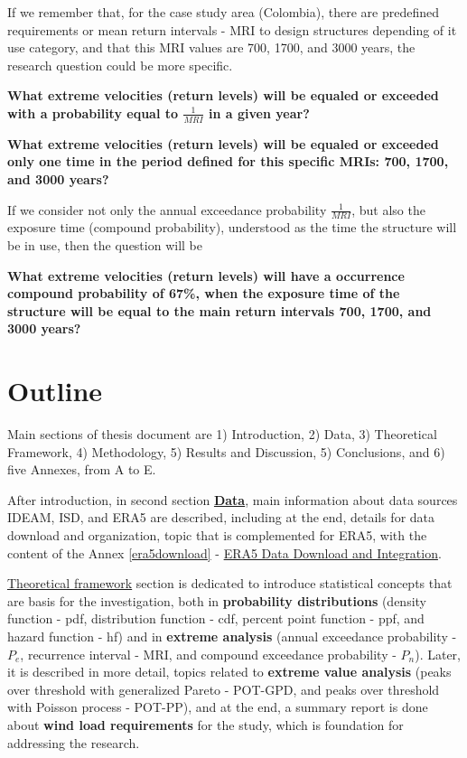 \documentclass[12pt,oneside]{reedthesis}
\begin{document}
If we remember that, for the case study area (Colombia), there are predefined requirements or mean return intervals - MRI to design structures depending of it use category, and that this MRI values are 700, 1700, and 3000 years, the research question could be more specific.

\textbf{What extreme velocities (return levels) will be equaled or exceeded with a probability equal to \(\frac{1}{MRI}\) in a given year?}

\textbf{What extreme velocities (return levels) will be equaled or exceeded only one time in the period defined for this specific MRIs: 700, 1700, and 3000 years?}

If we consider not only the annual exceedance probability \(\frac{1}{MRI}\), but also the exposure time (compound probability), understood as the time the structure will be in use, then the question will be

\textbf{What extreme velocities (return levels) will have a occurrence compound probability of 67\%, when the exposure time of the structure will be equal to the main return intervals 700, 1700, and 3000 years?}

\hypertarget{outline}{%
\section{Outline}\label{outline}}

Main sections of thesis document are 1) Introduction, 2) Data, 3) Theoretical Framework, 4) Methodology, 5) Results and Discussion, 5) Conclusions, and 6) five Annexes, from A to E.

After introduction, in second section \textbf{\protect\hyperlink{rmd-data}{Data}}, main information about data sources IDEAM, ISD, and ERA5 are described, including at the end, details for data download and organization, topic that is complemented for ERA5, with the content of the Annex \ref{era5download} - \protect\hyperlink{era5download}{ERA5 Data Download and Integration}.

\protect\hyperlink{rmd-thefra}{Theoretical framework} section is dedicated to introduce statistical concepts that are basis for the investigation, both in \textbf{probability distributions} (density function - pdf, distribution function - cdf, percent point function - ppf, and hazard function - hf) and in \textbf{extreme analysis} (annual exceedance probability - \(P_e\), recurrence interval - MRI, and compound exceedance probability - \(P_n\)). Later, it is described in more detail, topics related to \textbf{extreme value analysis} (peaks over threshold with generalized Pareto - POT-GPD, and peaks over threshold with Poisson process - POT-PP), and at the end, a summary report is done about \textbf{wind load requirements} for the study, which is foundation for addressing the research.
\end{document}
